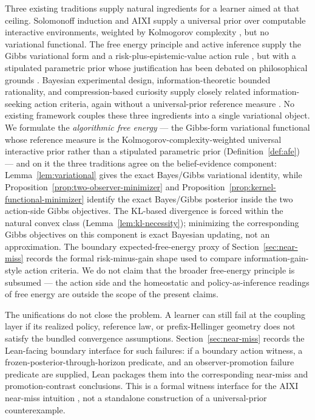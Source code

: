 \documentclass[11pt]{article}
\theoremstyle{definition}
\theoremstyle{remark}
\theoremstyle{plain}
\theoremstyle{definition}
\begin{document}
Three existing traditions supply natural ingredients for a learner aimed at that ceiling. Solomonoff induction and AIXI supply a universal prior over computable interactive environments, weighted by Kolmogorov complexity \citep{Solomonoff1964a,Solomonoff1964b,Kolmogorov1965,Hutter2005}, but no variational functional. The free energy principle and active inference supply the Gibbs variational form and a risk-plus-epistemic-value action rule \citep{Friston2010,FristonEtAl2017Curiosity,ParrFriston2019}, but with a stipulated parametric prior whose justification has been debated on philosophical grounds \citep{ColomboWright2021}. Bayesian experimental design, information-theoretic bounded rationality, and compression-based curiosity supply closely related information-seeking action criteria, again without a universal-prior reference measure \citep{Lindley1956,ChalonerVerdinelli1995,MacKay1992,OrtegaBraun2013,Schmidhuber1991,Schmidhuber2010}. No existing framework couples these three ingredients into a single variational object. We formulate the \emph{algorithmic free energy} --- the Gibbs-form variational functional whose reference measure is the Kolmogorov-complexity-weighted universal interactive prior rather than a stipulated parametric prior (Definition~\ref{def:afe}) --- and on it the three traditions agree on the belief-evidence component: Lemma~\ref{lem:variational} gives the exact Bayes/Gibbs variational identity, while Proposition~\ref{prop:two-observer-minimizer} and Proposition~\ref{prop:kernel-functional-minimizer} identify the exact Bayes/Gibbs posterior inside the two action-side Gibbs objectives. The KL-based divergence is forced within the natural convex class (Lemma~\ref{lem:kl-necessity}); minimizing the corresponding Gibbs objectives on this component is exact Bayesian updating, not an approximation. The boundary expected-free-energy proxy of Section~\ref{sec:near-miss} records the formal risk-minus-gain shape used to compare information-gain-style action criteria. We do not claim that the broader free-energy principle is subsumed --- the action side and the homeostatic and policy-as-inference readings of free energy are outside the scope of the present claims.

The unifications do not close the problem. A learner can still fail at the coupling layer if its realized policy, reference law, or prefix-Hellinger geometry does not satisfy the bundled convergence assumptions. Section~\ref{sec:near-miss} records the Lean-facing boundary interface for such failures: if a boundary action witness, a frozen-posterior-through-horizon predicate, and an observer-promotion failure predicate are supplied, Lean packages them into the corresponding near-miss and promotion-contrast conclusions. This is a formal witness interface for the AIXI near-miss intuition \citep{LeikeHutter2015,Leike2016,LeikeEtAl2016}, not a standalone construction of a universal-prior counterexample.
\end{document}
